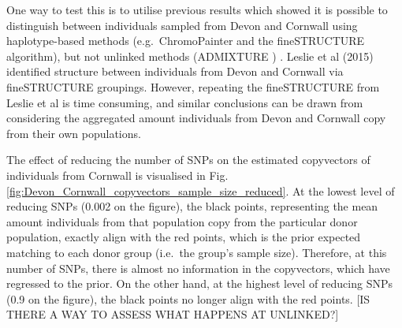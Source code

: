 One way to test this is to utilise previous results which showed it is possible to distinguish between individuals sampled from Devon and Cornwall using haplotype-based methods (e.g.\ ChromoPainter and the fineSTRUCTURE algorithm), but not unlinked methods (ADMIXTURE \cite{alexander2009fast}) \cite{Leslie2015}. Leslie et al (2015) identified structure between individuals from Devon and Cornwall via fineSTRUCTURE groupings. However, repeating the fineSTRUCTURE from Leslie et al is time consuming, and similar conclusions can be drawn from considering the aggregated amount individuals from Devon and Cornwall copy from their own populations.

The effect of reducing the number of SNPs on the estimated copyvectors of individuals from Cornwall is visualised in Fig. \ref{fig:Devon_Cornwall_copyvectors_sample_size_reduced}. At the lowest level of reducing SNPs (0.002 on the figure), the black points, representing the mean amount individuals from that population copy from the particular donor population, exactly align with the red points, {\color{red}which is the prior expected matching to each donor group (i.e.\ the group's sample size). Therefore, at this number of SNPs, there is almost no information in the copyvectors, which have regressed to the prior.} On the other hand, at the highest level of reducing SNPs (0.9 on the figure), the black points no longer align with the red points. {\color{red}[IS THERE A WAY TO ASSESS WHAT HAPPENS AT UNLINKED?]}

